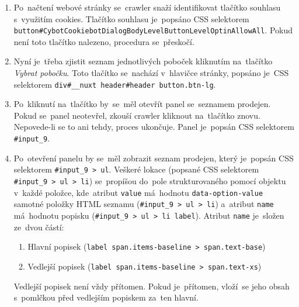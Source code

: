 \begin{enumerate}
    \item Po~načtení webové stránky se~crawler snaží identifikovat tlačítko
        souhlasu s~využitím cookies. Tlačítko souhlasu je~popsáno CSS
        selektorem\\
        \texttt{button\#CybotCookiebotDialogBodyLevelButtonLevelOptinAllowAll}.
        Pokud není toto tlačítko nalezeno, procedura se~přeskočí.
    \item Nyní je~třeba zjistit seznam jednotlivých poboček kliknutím
        na~tlačítko \emph{Vybrat pobočku}. Toto tlačítko se~nachází
        v~hlavičce stránky, popsáno je~CSS selektorem
        \texttt{div\#\_\_nuxt header\#header button.btn-lg}.
    \item Po~kliknutí na~tlačítko by~se~měl otevřít panel se~seznamem
        prodejen. Pokud se~panel neotevřel, zkouší crawler kliknout
        na~tlačítko znovu. Nepovede-li se to ani tehdy, proces ukončuje.
        Panel je~popsán CSS selektorem \texttt{\#input\_9}.
    \item Po~otevření panelu by se~měl zobrazit seznam prodejen, který
        je~popsán CSS selektorem \texttt{\#input\_9 > ul}. Veškeré lokace
        (popsané CSS selektorem \texttt{\#input\_9 > ul > li}) se~propíšou
        do~pole strukturovaného pomocí objektu v~každé položce, kde~atribut
        \texttt{value} má~hodnotu \texttt{data-option-value} samotné položky
        HTML seznamu (\texttt{\#input\_9 > ul > li}) a~atribut \texttt{name}
        má~hodnotu popisku (\texttt{\#input\_9 > ul > li label}). Atribut
        \texttt{name} je~složen ze~dvou částí:

        \begin{enumerate}
            \item Hlavní popisek
                (\texttt{label span.items-baseline > span.text-base})
            \item Vedlejší popisek
                (\texttt{label span.items-baseline > span.text-xs})
        \end{enumerate}
        
        Vedlejší popisek není vždy přítomen. Pokud je~přítomen, vloží~se
        jeho obsah s~pomlčkou před vedlejším popiskem za~ten hlavní.


\end{enumerate}
